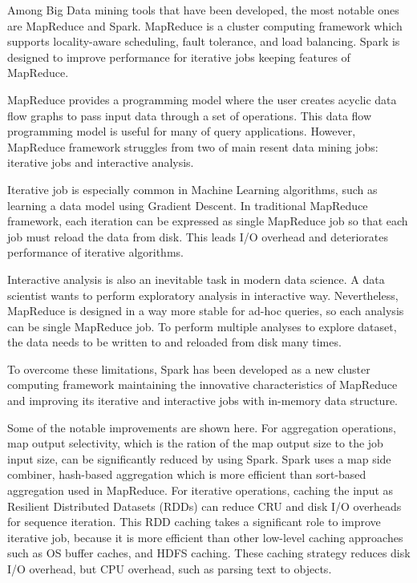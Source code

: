 
Among Big Data mining tools that have been developed, the most notable ones are MapReduce and Spark. MapReduce is a cluster computing framework 
which supports locality-aware scheduling, fault tolerance, and load balancing. Spark is designed to improve performance for iterative jobs keeping features of MapReduce. 

MapReduce provides a programming model where the user creates acyclic data flow graphs to pass input data through a set of operations. This 
data flow programming model is useful for many of query applications. However, MapReduce framework struggles from two of main resent data mining jobs: iterative jobs and interactive analysis. 

Iterative job is especially common in Machine Learning algorithms, such as learning a data model using Gradient Descent. In traditional MapReduce framework, each iteration can be expressed as single MapReduce job 
so that each job must reload the data from disk. This leads I/O overhead and deteriorates performance of iterative algorithms. 

Interactive analysis is also an inevitable task in modern data science. A data scientist wants to perform exploratory analysis in interactive way. 
Nevertheless, MapReduce is designed in a way more stable for ad-hoc queries, so each analysis can be single MapReduce job. 
To perform multiple analyses to explore dataset, the data needs to be written to and reloaded from disk many times. 

To overcome these limitations, Spark has been developed as a new cluster computing framework maintaining the innovative characteristics of MapReduce and improving 
its iterative and interactive jobs with in-memory data structure.

Some of the notable improvements are shown here\cite{DBLP:journals/pvldb/ShiQMJWRO15}. For aggregation operations, map output selectivity, which is the ration of the map output size to the job input size, 
can be significantly reduced by using Spark. Spark uses a map side combiner, hash-based aggregation which is more efficient than sort-based aggregation used in MapReduce. 
For iterative operations, caching the input as Resilient Distributed Datasets (RDDs) can reduce CRU and disk I/O overheads for sequence iteration. 
This RDD caching takes a significant role to improve iterative job, because it is more efficient than other low-level caching approaches such as OS buffer caches, and HDFS caching. 
These caching strategy reduces disk I/O overhead, but CPU overhead, such as parsing text to objects.
